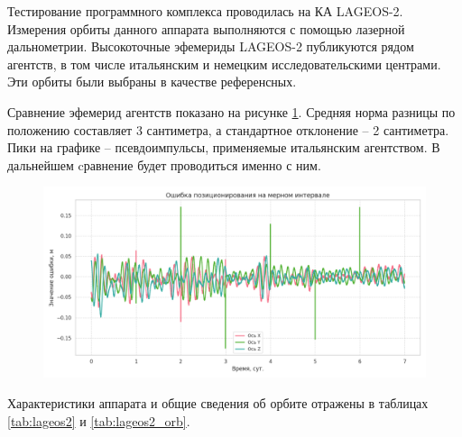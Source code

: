 Тестирование программного комплекса проводилась на КА LAGEOS-2.
Измерения орбиты данного аппарата выполняются с помощью лазерной дальнометрии.
Высокоточные эфемериды LAGEOS-2 публикуются рядом агентств, 
в том числе итальянским и немецким исследовательскими центрами. Эти орбиты
были выбраны в качестве референсных. 

Сравнение эфемерид агентств показано на рисунке \ref{fig:compare_agencies}. Средняя
норма разницы по положению составляет 3 сантиметра, а стандартное отклонение -- 2 сантиметра. 
Пики на графике -- псевдоимпульсы, применяемые итальянским агентством. В дальнейшем cравнение
будет проводиться именно с ним.

\begin{figure}[h!]
    \centering
    \includegraphics[width=\linewidth]{../images/solution/lageos/compare_agencies.png}
    \label{fig:compare_agencies}
 \end{figure}

Характеристики аппарата и общие сведения об орбите отражены в таблицах \ref{tab:lageos2}
и \ref{tab:lageos2_orb}.

